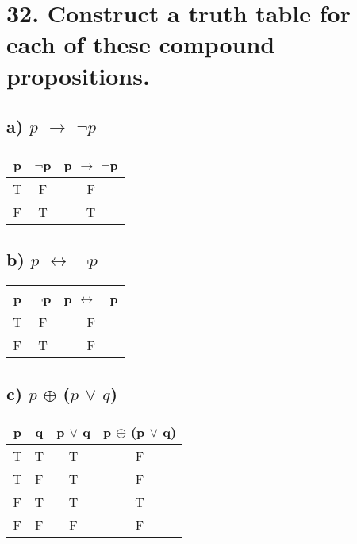 \documentclass[11pt, oneside]{article} %
\numberwithin{equation}{section} %
\numberwithin{figure}{section} %
\numberwithin{table}{section} %
\begin{document}
\begin{table}[!htp]
\section{32. Construct a truth table for each of these compound propositions.}

\subsection{a) $p$ $\rightarrow$ $\neg$$p$}
\begin{tabular}{c c c}
\hline\hline
p & $\neg$p &  p $\rightarrow$ $\neg$p \\ [0.5ex] %
\hline
T & F & F\\
F & T & T \\ [1ex]
\hline
\end{tabular}
\label{table:nonlin}
\end{table}

\begin{table}[!htp]
\subsection{b) $p$ $\leftrightarrow$ $\neg$$p$}
\begin{tabular}{c c c}
\hline\hline
p & $\neg$p &  p $\leftrightarrow$ $\neg$p \\ [0.5ex] %
\hline
T & F & F\\
F & T & F \\ [1ex]
\hline
\end{tabular}
\label{table:nonlin}
\end{table}

\begin{table}[!htp]
\subsection{c) $p$ $\oplus$ ($p$  $\vee$ $q$)}
\begin{tabular}{c c c c}
\hline\hline
p & q &  p  $\vee$ q & p $\oplus$ (p  $\vee$ q) \\ [0.5ex] %
\hline
T & T & T & F\\
T & F & T & F \\
F & T & T & T \\
F & F & F & F\\ [1ex]
\hline
\end{tabular}
\label{table:nonlin}
\end{table}
\end{document}
